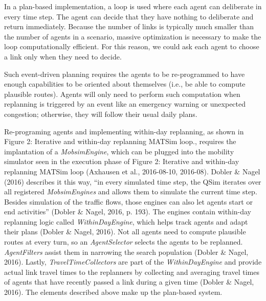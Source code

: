 \documentclass[fancy, oneside, mastersfancy, ms]{byuthesis}
\begin{document}
In a plan-based implementation, a loop is used where each agent can
deliberate in every time step. The agent can decide that they have
nothing to deliberate and return immediately. Because the number of
links is typically much smaller than the number of agents in a scenario,
massive optimization is necessary to make the loop computationally
efficient. For this reason, we could ask each agent to choose a link
only when they need to decide.

Such event-driven planning requires the agents to be re-programmed to
have enough capabilities to be oriented about themselves (i.e., be able
to compute plausible routes). Agents will only need to perform such
computation when replanning is triggered by an event like an emergency
warning or unexpected congestion; otherwise, they will follow their
usual daily plans.

Re-programing agents and implementing within-day replanning, as shown in
Figure 2: Iterative and within-day replanning MATSim loop., requires the
implantation of a \emph{MobsimEngine}, which can be plugged into the
mobility simulator seen in the execution phase of Figure 2: Iterative
and within-day replanning MATSim loop (Axhausen et al., 2016-08-10,
2016-08). Dobler \& Nagel (2016) describes it this way, ``in every
simulated time step, the QSim iterates over all registered
\emph{MobsimEngines} and allows them to simulate the current time step.
Besides simulation of the traffic flows, those engines can also let
agents start or end activities'' (Dobler \& Nagel, 2016, p. 193). The
engines contain within-day replanning logic called
\emph{WithinDayEngine}, which helps track agents and adapt their plans
(Dobler \& Nagel, 2016). Not all agents need to compute plausible routes
at every turn, so an \emph{AgentSelector} selects the agents to be
replanned. \emph{AgentFilters} assist them in narrowing the search
population (Dobler \& Nagel, 2016). Lastly, \emph{TravelTimeCollectors}
are part of the \emph{WithinDayEngine} and provide actual link travel
times to the replanners by collecting and averaging travel times of
agents that have recently passed a link during a given time (Dobler \&
Nagel, 2016). The elements described above make up the plan-based
system.
\end{document}
